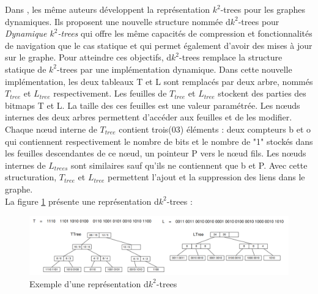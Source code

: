 Dans \citep{brisaboa2012compressed}, les même auteurs développent la représentation $k^2$-trees pour les graphes dynamiques. Ils proposent une nouvelle structure nommée d$k^2$-trees pour \textit{Dynamique $k^2$-trees} qui offre les même capacités de compression et fonctionnalités de navigation que le cas statique et qui permet également d'avoir des mises à jour sur le graphe. Pour atteindre ces objectifs, d$k^2$-trees remplace la structure statique de $k^2$-trees par une implémentation dynamique. Dans cette nouvelle implémentation, les deux tableaux T et L sont remplacés par deux arbre, nommés $T_{tree}$ et $L_{tree}$ respectivement. Les feuilles de $T_{tree}$ et $L_{tree}$ stockent des parties des bitmaps T et L. La taille des ces feuilles est une valeur paramétrée. Les nœuds internes des deux arbres permettent d'accéder aux feuilles et de les modifier.
Chaque nœud interne de $T_{tree}$ contient trois(03) éléments : deux compteurs b et o qui contiennent respectivement le nombre de bits et le nombre de "1" stockés dans les feuilles descendantes de ce nœud, un pointeur P vers le nœud fils. Les nœuds internes de $L_{trees}$ sont similaires sauf qu'ils ne contiennent que b et P. Avec cette structuration, $T_{tree}$ et $L_{tree}$ permettent l'ajout et la suppression des liens dans le graphe.\\
La figure \ref{dk2-trees} présente une représentation d$k^2$-trees \citep{brisaboa2012compressed}: 
\begin{figure}[H]
\begin{center}
\includegraphics[height=100 pt, width=380 pt]{./ressources/image/dk2-trees.png} 
\end{center}
\caption{Exemple d'une représentation d$k^2$-trees}
\label{dk2-trees}
\end{figure}


